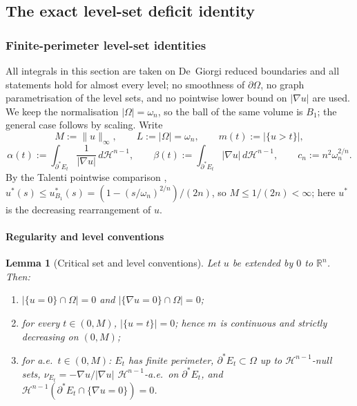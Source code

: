 \documentclass[11pt]{amsart}
\newtheorem{lemma}[theorem]{Lemma}
\theoremstyle{definition}
\newcommand{\R}{\mathbb R}
\newcommand{\Om}{\Omega}
\newcommand{\Hn}{\mathcal H^{n-1}}
\begin{document}
\subsection{The exact level-set deficit identity}\label{sec:new-FK-proof}

\subsubsection{Finite-perimeter level-set identities}\label{sec:identity}

All integrals in this section are taken on De~Giorgi reduced boundaries and all
statements hold for almost every level; no smoothness of \(\partial\Om\), no
graph parametrisation of the level sets, and no pointwise lower bound on
\(|\nabla u|\) are used.  We keep the normalisation \(|\Om|=\omega_n\), so the
ball of the same volume is \(B_1\); the general case follows by scaling.  Write
\[
   M:=\|u\|_\infty,\qquad L:=|\Om|=\omega_n,\qquad
   m(t):=|\{u>t\}|,
\]
\[
   \alpha(t):=\int_{\partial^*E_t}\frac1{|\nabla u|}\,d\Hn,\qquad
   \beta(t):=\int_{\partial^*E_t}|\nabla u|\,d\Hn,\qquad
   c_n:=n^2\omega_n^{2/n}.
\]
By the Talenti pointwise comparison \cite{Talenti1976},
\(u^*(s)\le u_{B_1}^*(s)=(1-(s/\omega_n)^{2/n})/(2n)\), so
\(M\le 1/(2n)<\infty\); here \(u^*\) is the decreasing rearrangement of \(u\).

\paragraph*{Regularity and level conventions}

\begin{lemma}[Critical set and level conventions]\label{lem:id-noatoms}
Let \(u\) be extended by \(0\) to \(\R^n\).  Then:
\begin{enumerate}[label=\textup{(\alph*)},leftmargin=2.2em]
\item \(|\{u=0\}\cap\Om|=0\) and \(|\{\nabla u=0\}\cap\Om|=0\);
\item for every \(t\in(0,M)\), \(|\{u=t\}|=0\); hence \(m\) is continuous and
strictly decreasing on \((0,M)\);
\item for a.e.\ \(t\in(0,M)\): \(E_t\) has finite perimeter,
\(\partial^*E_t\subset\Om\) up to \(\Hn\)-null sets,
\(\nu_{E_t}=-\nabla u/|\nabla u|\) \(\Hn\)-a.e.\ on \(\partial^*E_t\), and
\(\Hn(\partial^*E_t\cap\{\nabla u=0\})=0\).
\end{enumerate}
\end{lemma}
\end{document}
